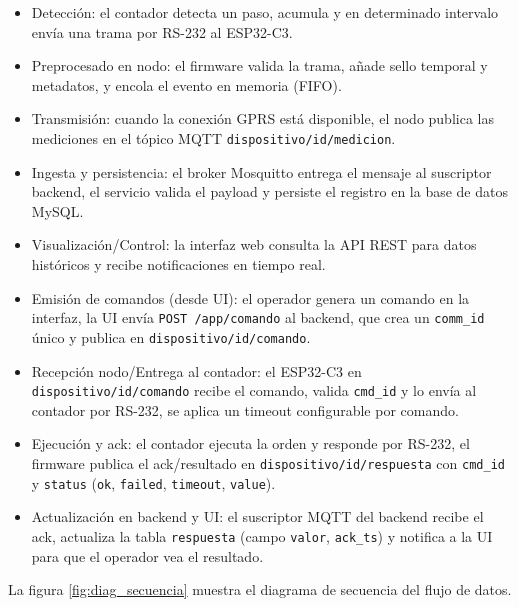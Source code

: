 \begin{itemize}

  \item Detección: el contador detecta un paso, acumula y en determinado intervalo envía una trama por RS-232 al ESP32-C3.

  \item Preprocesado en nodo: el firmware valida la trama, añade sello temporal y metadatos, y encola el evento en memoria (FIFO).

  \item Transmisión: cuando la conexión GPRS está disponible, el nodo publica las mediciones en el tópico MQTT \texttt{dispositivo/{id}/medicion}.
  
  \item Ingesta y persistencia: el broker Mosquitto entrega el mensaje al suscriptor backend, el servicio valida el payload y persiste el registro en la base de datos MySQL.
  
  \item Visualización/Control: la interfaz web consulta la API REST para datos históricos y recibe notificaciones en tiempo real.
  
  \item Emisión de comandos (desde UI): el operador genera un comando en la interfaz, la UI envía
  \texttt{POST /app/comando} al backend, que crea un \texttt{comm\_id} único y publica en \texttt{dispositivo/{id}/comando}.
  
  \item Recepción nodo/Entrega al contador: el ESP32-C3 en \\ \texttt{dispositivo/{id}/comando} recibe el comando, valida \texttt{cmd\_id} y lo envía al contador por RS-232, se aplica un timeout configurable por comando.
  
  \item Ejecución y ack: el contador ejecuta la orden y responde por RS-232, el firmware publica el ack/resultado en \texttt{dispositivo/{id}/respuesta} con \texttt{cmd\_id} y \texttt{status} (\texttt{ok}, \texttt{failed}, \texttt{timeout}, \texttt{value}).

  \item Actualización en backend y UI: el suscriptor MQTT del backend recibe el ack, actualiza la tabla \texttt{respuesta} (campo \texttt{valor}, \texttt{ack\_ts}) y notifica a la UI para que el operador vea el resultado.
\end{itemize}
\pagebreak
La figura \ref{fig:diag_secuencia} muestra el diagrama de secuencia del flujo de datos.

